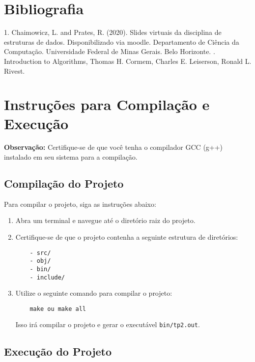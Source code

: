 \documentclass{article}
\begin{document}
\section{Bibliografia}
1. Chaimowicz, L. and Prates, R. (2020). Slides virtuais da disciplina de estruturas de dados. Disponibilizado via moodle. Departamento de Ciência da Computação. Universidade
Federal de Minas Gerais. Belo Horizonte. 
. Introduction to Algorithms, Thomas H. Cormem, Charles E. Leiserson, Ronald L. Rivest.




\appendix
\newpage
\section{Instruções para Compilação e Execução}
\label{ap:compilacao_execucao}

\textbf{Observação:} Certifique-se de que você tenha o compilador GCC (g++) instalado em seu sistema para a compilação.

\subsection{Compilação do Projeto}

Para compilar o projeto, siga as instruções abaixo:

\begin{enumerate}
    \item Abra um terminal e navegue até o diretório raiz do projeto.
    \item Certifique-se de que o projeto contenha a seguinte estrutura de diretórios:
    
    \begin{verbatim}
    - src/
    - obj/
    - bin/
    - include/
    \end{verbatim}

    \item Utilize o seguinte comando para compilar o projeto:

    \begin{verbatim}
    make ou make all
    \end{verbatim}

    Isso irá compilar o projeto e gerar o executável \texttt{bin/tp2.out}.

\end{enumerate}

\subsection{Execução do Projeto}
\end{document}
